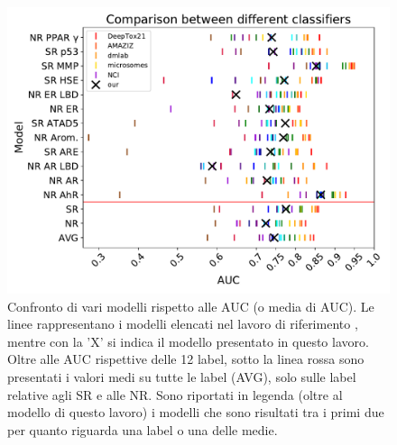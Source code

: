 \begin{figure}
	\centering
	\includegraphics[width=0.9\linewidth]{../images/pdf/comparison}
	\caption{Confronto di vari modelli rispetto alle AUC (o media di AUC). Le linee rappresentano i modelli elencati nel lavoro di riferimento \cite{mayr2016deeptox}, mentre con la 'X' si indica il modello presentato in questo lavoro. Oltre alle AUC rispettive delle 12 label, sotto la linea rossa sono presentati i valori medi su tutte le label (AVG), solo sulle label relative agli SR e alle NR. Sono riportati in legenda (oltre al modello di questo lavoro) i modelli che sono risultati tra i primi due per quanto riguarda una label o una delle medie.}
	\label{fig:comparison}
\end{figure}
